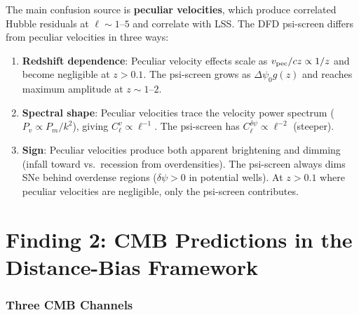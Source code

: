 \documentclass[11pt,a4paper]{article}
\newcommand{\Dpsi}{\Delta\psi}
\begin{document}
The main confusion source is \textbf{peculiar velocities}, which
produce correlated Hubble residuals at $\ell \sim 1$--$5$ and
correlate with LSS.  The DFD psi-screen differs from peculiar
velocities in three ways:
\begin{enumerate}[nosep]
\item \textbf{Redshift dependence}: Peculiar velocity effects scale
  as $v_{\rm pec}/cz \propto 1/z$ and become negligible at $z > 0.1$.
  The psi-screen grows as $\Dpsi_0 g(z)$ and reaches maximum
  amplitude at $z \sim 1$--$2$.
\item \textbf{Spectral shape}: Peculiar velocities trace the
  velocity power spectrum ($P_v \propto P_m/k^2$), giving
  $C_\ell^v \propto \ell^{-1}$.  The psi-screen has
  $C_\ell^{\delta\psi} \propto \ell^{-2}$ (steeper).
\item \textbf{Sign}: Peculiar velocities produce both apparent
  brightening and dimming (infall toward vs.\ recession from
  overdensities).  The psi-screen always dims SNe behind
  overdense regions ($\delta\psi > 0$ in potential wells).
  At $z > 0.1$ where peculiar velocities are negligible, only
  the psi-screen contributes.
\end{enumerate}


\part{Finding 2: CMB Predictions in the Distance-Bias Framework}
\label{sec:cmb}


\section{Three CMB Channels}
\end{document}

